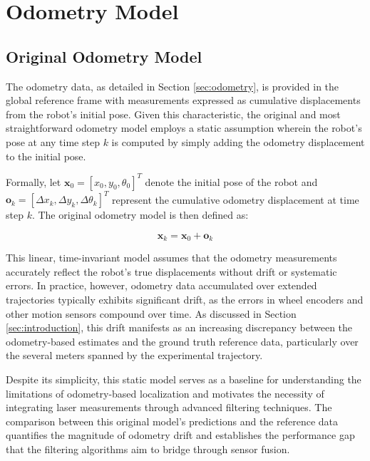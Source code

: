 \documentclass[conference]{IEEEtran}
\begin{document}
\section{Odometry Model} \label{sec:odometry_model}

\subsection{Original Odometry Model} \label{sec:odometry_model_original}

The odometry data, as detailed in Section \ref{sec:odometry}, is provided in the global reference frame with measurements expressed as cumulative displacements from the robot's initial pose. Given this characteristic, the original and most straightforward odometry model employs a static assumption wherein the robot's pose at any time step $k$ is computed by simply adding the odometry displacement to the initial pose.

Formally, let $\mathbf{x}_0 = [x_0, y_0, \theta_0]^T$ denote the initial pose of the robot and $\mathbf{o}_k = [\Delta x_k, \Delta y_k, \Delta \theta_k]^T$ represent the cumulative odometry displacement at time step $k$. The original odometry model is then defined as:

\begin{equation}
    \mathbf{x}_k = \mathbf{x}_0 + \mathbf{o}_k
\end{equation}

This linear, time-invariant model assumes that the odometry measurements accurately reflect the robot's true displacements without drift or systematic errors. In practice, however, odometry data accumulated over extended trajectories typically exhibits significant drift, as the errors in wheel encoders and other motion sensors compound over time. As discussed in Section \ref{sec:introduction}, this drift manifests as an increasing discrepancy between the odometry-based estimates and the ground truth reference data, particularly over the several meters spanned by the experimental trajectory.

Despite its simplicity, this static model serves as a baseline for understanding the limitations of odometry-based localization and motivates the necessity of integrating laser measurements through advanced filtering techniques. The comparison between this original model's predictions and the reference data quantifies the magnitude of odometry drift and establishes the performance gap that the filtering algorithms aim to bridge through sensor fusion.
\end{document}
